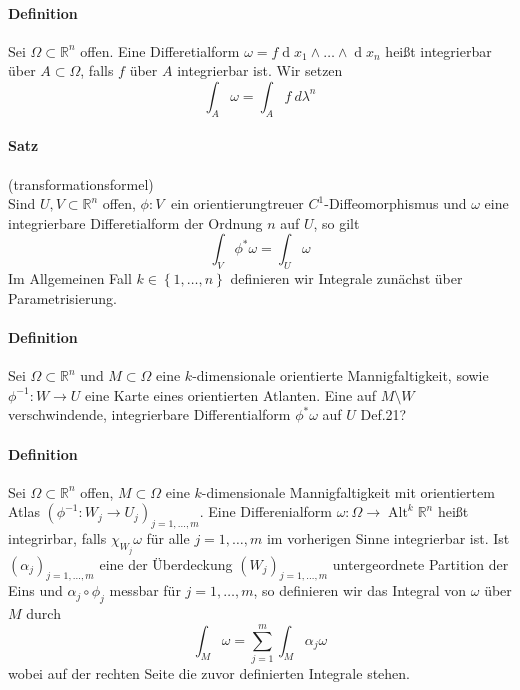 \documentclass[12pt,a4paper,fleqn]{article}
\def\set#1{{\left\{ #1 \right\}}}
\def\R{{\mathbb{R}}}
\def\d{{\operatorname{d}}}
\begin{document}
\paragraph{Definition} Sei $\Omega\subset \R^n$ offen. Eine Differetialform $\omega= f\d x_1\wedge\dots\wedge\d x_n$ heißt integrierbar über $A\subset\Omega$, falls $f$ über $A$ integrierbar ist. Wir setzen
\begin{displaymath}
\int_A \omega = \int_A f\ d\lambda^n
\end{displaymath}

\paragraph{Satz} (transformationsformel)\\
Sind $U, V\subset \R^n$ offen, $\phi\colon V\ $ ein orientierungtreuer $C^1$-Diffeomorphismus und $\omega$ eine integrierbare Differetialform der Ordnung $n$ auf $U$, so gilt
\begin{displaymath}
\int_V \phi^\ast\omega = \int_U \omega
\end{displaymath}
Im Allgemeinen Fall $k \in \set{1, \dots, n}$ definieren wir Integrale zunächst über Parametrisierung.

\paragraph{Definition} Sei $\Omega\subset\R^n$ und $M\subset\Omega$ eine $k$-dimensionale orientierte Mannigfaltigkeit, sowie $\phi^{-1}\colon W \rightarrow U$ eine Karte eines orientierten Atlanten. Eine auf $M\setminus W$ verschwindende, integrierbare Differentialform $\phi^\ast\omega$ auf $U$
Def.21?

\paragraph{Definition} Sei $\Omega\subset\R^n$ offen, $M\subset\Omega$ eine $k$-dimensionale Mannigfaltigkeit mit orientiertem Atlas $(\phi^{-1}\colon W_j \rightarrow U_j)_{j = 1, \dots, m}$. Eine Differenialform $\omega\colon \Omega \rightarrow\operatorname{Alt}^k \R^n$ heißt integrirbar, falls $\chi_{W_j}\omega$ für alle $j=1, \dots, m$ im vorherigen Sinne integrierbar ist. Ist $(\alpha_j)_{j=1, \dots, m}$ eine der Überdeckung $(W_j)_{j=1, \dots, m}$ untergeordnete Partition der Eins und $\alpha_j\circ\phi_j$ messbar für $j=1, \dots, m$, so definieren wir das Integral von $\omega$ über $M$ durch
\begin{displaymath}
\int_M \omega = \sum_{j=1}^m \int_M \alpha_j\omega
\end{displaymath}
wobei auf der rechten Seite die zuvor definierten Integrale stehen.
\end{document}
